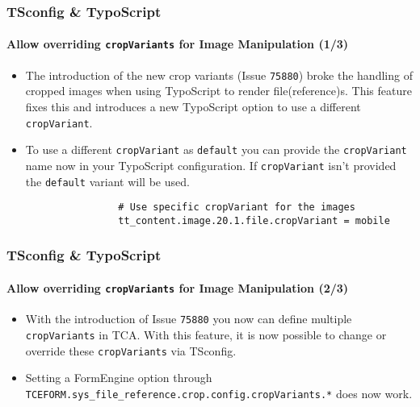 \begin{frame}[fragile]
	\frametitle{TSconfig \& TypoScript}
	\framesubtitle{Allow overriding \texttt{cropVariants} for Image Manipulation (1/3)}

	\begin{itemize}
		\item The introduction of the new crop variants (Issue \texttt{75880}) broke the handling of
			cropped images when using TypoScript to render file(reference)s. This feature fixes
			this and introduces a new TypoScript option to use a different \texttt{cropVariant}.

		\item To use a different \texttt{cropVariant} as \texttt{default} you can provide the
			\texttt{cropVariant} name now in your TypoScript configuration. If \texttt{cropVariant}
			isn't provided the \texttt{default} variant will be used.

			\begin{lstlisting}
				# Use specific cropVariant for the images
				tt_content.image.20.1.file.cropVariant = mobile
			\end{lstlisting}
	\end{itemize}

\end{frame}



\begin{frame}[fragile]
	\frametitle{TSconfig \& TypoScript}
	\framesubtitle{Allow overriding \texttt{cropVariants} for Image Manipulation (2/3)}

	\begin{itemize}
		\item With the introduction of Issue \texttt{75880} you now can define multiple \texttt{cropVariants}
			in TCA. With this feature, it is now possible to change or override these \texttt{cropVariants}
			via TSconfig.

		\item Setting a FormEngine option through
			\texttt{TCEFORM.sys\_file\_reference.crop.config.cropVariants.*} does now work.

	\end{itemize}

\end{frame}


